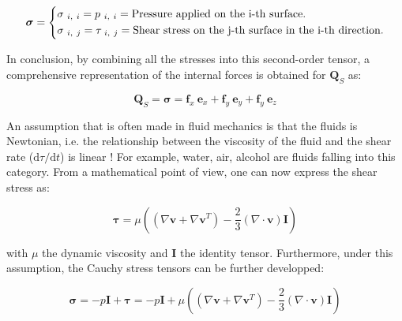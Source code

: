 \begin{equation}
\boldsymbol{\sigma} =
\begin{dcases}
\sigma_{\ i, \ i} = p_{\ i, \ i} = \text{Pressure applied on the i-th surface.}\\
\sigma_{\ i, \ j} = \tau_{\ i, \ j} =\text{Shear stress on the j-th surface in the i-th direction.}\\
\end{dcases}
\label{C2 - EQ - Cauchy stress tensor}
\end{equation}
\vspace{0.3em}

In conclusion, by combining all the stresses into this second-order tensor, a comprehensive representation of the internal forces is obtained for $\mathbf{Q}_S$  as:

\vspace{0.2em}
\begin{equation}
\mathbf{Q}_S = \boldsymbol{\sigma} = \mathbf{f}_x \ \mathbf{e}_x + \mathbf{f}_y \ \mathbf{e}_y + \mathbf{f}_y \ \mathbf{e}_z
\label{C2 - EQ - Internal forces}
\end{equation}

\newpage

An assumption that is often made in fluid mechanics is that the fluids is Newtonian, i.e. the relationship between the viscosity of the fluid and the shear rate ($\mathrm{d}\tau/\mathrm{d}t$) is linear !  For example, water, air, alcohol are fluids falling into this category. From a mathematical point of view, one can now express the shear stress as:

\begin{equation}
\boldsymbol{\tau}=\mu\left(\left(\nabla \mathbf{v}+\nabla \mathbf{v}^T\right)-\frac{2}{3}(\nabla \cdot \mathbf{v}) \mathbf{I}\right)
\label{C2 - EQ - Shear stress for newtonian fluids}
\end{equation}
\vspace{-0.1em}

with $\mu$ the dynamic viscosity and $\mathbf{I}$ the identity tensor. Furthermore, under this assumption, the Cauchy stress tensors can be further developped:

\vspace{0.2em}
\begin{equation}
\boldsymbol{\sigma}  = -p \mathbf{I} + \boldsymbol{\tau} =  -p \mathbf{I} + \mu\left(\left(\nabla \mathbf{v}+\nabla \mathbf{v}^T\right)-\frac{2}{3}(\nabla \cdot \mathbf{v}) \mathbf{I}\right)
\label{C2 - EQ - Cauchy stress tensor for newtonian fluids}
\end{equation}
\vspace{-0.1em}

